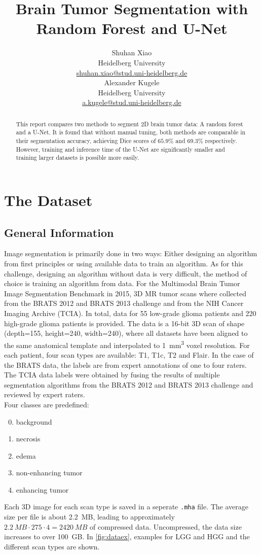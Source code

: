 \documentclass[final]{article}
\title{Brain Tumor Segmentation with Random Forest and U-Net}
\author{
  Shuhan Xiao \\
  Heidelberg University \\
  \href{mailto:shuhan.xiao@stud.uni-heidelberg.de}{shuhan.xiao@stud.uni-heidelberg.de}\\
  \And
  Alexander Kugele \\
  Heidelberg University \\
  \href{mailto:a.kugele@stud.uni-heidelberg.de}{a.kugele@stud.uni-heidelberg.de}\\
}
\begin{document}
\maketitle

\begin{abstract}
This report compares two methods to segment 2D brain tumor data: A random
forest and a U-Net. It is found that without manual tuning, both methods are
comparable in their segmentation accuracy, achieving Dice scores of $65.9 \%$
and $69.3 \%$ respectively. However, training and inference time of the U-Net
are significantly smaller and training larger datasets is possible more easily.
\end{abstract}

\section{The Dataset}

\subsection{General Information}
Image segmentation is primarily done in two ways: Either designing an algorithm
from first principles or using available data to train an algorithm. As for
this challenge, designing an algorithm without data is very difficult, the
method of choice is training an algorithm from data. For the Multimodal Brain
Tumor Image Segmentation Benchmark \citep{BRATS} in 2015, 3D MR tumor scans
where collected from the BRATS 2012 and BRATS 2013 challenge and from the NIH
Cancer Imaging Archive (TCIA). In total, data for 55 low-grade glioma patients
and 220 high-grade glioma patients is provided. The data is a 16-bit 3D scan of
shape (depth=155, height=240, width=240), where all datasets have been aligned
to the same anatomical template and interpolated to \SI{1}{\mm^3} voxel
resolution. For each patient, four scan types are available: T1, T1c, T2 and
Flair. In the case of the BRATS data, the labels are from expert annotations of
one to four raters. The TCIA data labels were obtained by fusing the results of
multiple segmentation algorithms from the BRATS 2012 and BRATS 2013 challenge
and reviewed by expert raters.\\
Four classes are predefined:
\begin{enumerate}[label=\arabic*),topsep=0pt]
  \setcounter{enumi}{-1}
\item background
\item necrosis
\item edema
\item non-enhancing tumor
\item enhancing tumor
\end{enumerate}
Each 3D image for each scan type is saved in a seperate \verb+.mha+ file. The
average size per file is about \SI{2.2}{MB}, leading to approximately
$\SI{2.2}{MB}\cdot 275 \cdot 4 = \SI{2420}{MB}$ of compressed data.
Uncompressed, the data size increases to over \SI{100}{GB}. In
\cref{fig:dataex}, examples for LGG and HGG and the different scan types are
shown.
\end{document}

